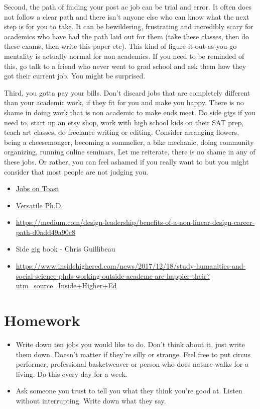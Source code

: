 \documentclass[]{book}
\providecommand{\tightlist}{%
  \setlength{\itemsep}{0pt}\setlength{\parskip}{0pt}}
\begin{document}
Second, the path of finding your post ac job can be trial and error. It
often does not follow a clear path and there isn't anyone else who can
know what the next step is for you to take. It can be bewildering,
frustrating and incredibly scary for academics who have had the path
laid out for them (take these classes, then do these exams, then write
this paper etc). This kind of figure-it-out-as-you-go mentality is
actually normal for non academics. If you need to be reminded of this,
go talk to a friend who never went to grad school and ask them how they
got their current job. You might be surprised.

Third, you gotta pay your bills. Don't discard jobs that are completely
different than your academic work, if they fit for you and make you
happy. There is no shame in doing work that is non academic to make ends
meet. Do side gigs if you need to, start up an etsy shop, work with high
school kids on their SAT prep, teach art classes, do freelance writing
or editing. Consider arranging flowers, being a cheesemonger, becoming a
sommelier, a bike mechanic, doing community organizing, running online
seminars, Let me reiterate, there is no shame in any of these jobs. Or
rather, you can feel ashamed if you really want to but you might
consider that most people are not judging you.

\begin{itemize}
\tightlist
\item
  \href{http://jobsontoast.com/}{Jobs on Toast}
\item
  \href{https://versatilephd.com/}{Versatile Ph.D.}
\item
  \url{https://medium.com/design-leadership/benefits-of-a-non-linear-design-career-path-d0add49a90c8}
\item
  Side gig book - Chris Guillibeau
\item
  \url{https://www.insidehighered.com/news/2017/12/18/study-humanities-and-social-science-phds-working-outside-academe-are-happier-their?utm_source=Inside+Higher+Ed}
\end{itemize}

\section{Homework}\label{homework-2}

\begin{itemize}
\tightlist
\item
  Write down ten jobs you would like to do. Don't think about it, just
  write them down. Doesn't matter if they're silly or strange. Feel free
  to put circus performer, professional basketweaver or person who does
  nature walks for a living. Do this every day for a week.
\item
  Ask someone you trust to tell you what they think you're good at.
  Listen without interrupting. Write down what they say.
\end{itemize}
\end{document}
